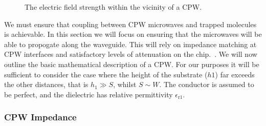 \begin{figure}
  \caption{
    The  electric field strength within the vicinity of a CPW.
  }
  \label{experiment:fig:CPWfield}
\end{figure}

We must ensure that coupling between CPW microwaves and trapped molecules is
achievable. In this section we will focus on ensuring that the microwaves will
be able to propogate along the waveguide. This will rely on impedance matching
at CPW interfaces and satisfactory levels of attenuation on the
chip.~\cite{Jackson1975, Simons2004}. We will now outline the basic mathematical
description of a CPW.  For our purposes it will be sufficient to consider the
case where the height of the substrate ($h1$) far exceeds the other distances,
that is $h_1 \gg S$, whilst $S \sim W$. The conductor is assumed to be perfect,
and the dielectric has relative permittivity $\epsilon_\mathrm{r1}$.

\subsubsection{CPW Impedance}

